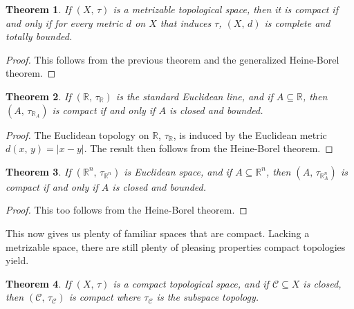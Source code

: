 \documentclass{article}
\theoremstyle{plain}
\newtheorem{theorem}{Theorem}[section]
\theoremstyle{normal}
\begin{document}
        \begin{theorem}
            If $(X,\,\tau)$ is a metrizable topological space, then it is
            compact if and only if for every metric $d$ on $X$ that induces
            $\tau$, $(X,\,d)$ is complete and totally bounded.
        \end{theorem}
        \begin{proof}
            This follows from the previous theorem and the generalized
            Heine-Borel theorem.
        \end{proof}
        \begin{theorem}
            If $(\mathbb{R},\,\tau_{\mathbb{R}})$ is the standard Euclidean
            line, and if $A\subseteq\mathbb{R}$, then
            $(A,\,\tau_{\mathbb{R}_{A}})$ is compact if and only if $A$ is
            closed and bounded.
        \end{theorem}
        \begin{proof}
            The Euclidean topology on $\mathbb{R}$,
            $\tau_{\mathbb{R}}$, is induced by the Euclidean metric
            $d(x,\,y)=|x-y|$. The result then follows from the Heine-Borel
            theorem.
        \end{proof}
        \begin{theorem}
            If $(\mathbb{R}^{n},\,\tau_{\mathbb{R}^{n}})$ is Euclidean space,
            and if $A\subseteq\mathbb{R}^{n}$, then
            $(A,\,\tau_{\mathbb{R}^{n}_{A}})$ is compact if and only if $A$ is
            closed and bounded.
        \end{theorem}
        \begin{proof}
            This too follows from the Heine-Borel theorem.
        \end{proof}
        This now gives us plenty of familiar spaces that are compact.
        Lacking a metrizable space, there are still plenty of pleasing
        properties compact topologies yield.
        \begin{theorem}
            If $(X,\,\tau)$ is a compact topological space, and if
            $\mathcal{C}\subseteq{X}$ is closed, then
            $(\mathcal{C},\,\tau_{\mathcal{C}})$ is compact where
            $\tau_{\mathcal{C}}$ is the subspace topology.
        \end{theorem}
\end{document}
